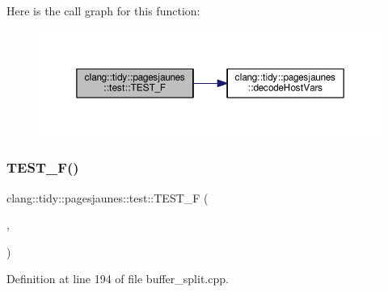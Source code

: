 Here is the call graph for this function\+:
\nopagebreak
\begin{figure}[H]
\begin{center}
\leavevmode
\includegraphics[width=350pt]{namespaceclang_1_1tidy_1_1pagesjaunes_1_1test_a72cdf106c1033f23fee1e696bccbc59a_cgraph}
\end{center}
\end{figure}
\mbox{\label{namespaceclang_1_1tidy_1_1pagesjaunes_1_1test_a165e5998fefd397abdb120da57c0ff98}} 
\subsubsection{\texorpdfstring{T\+E\+S\+T\+\_\+\+F()}{TEST\_F()}\hspace{0.1cm}{\footnotesize\ttfamily [44/57]}}
{\footnotesize\ttfamily clang\+::tidy\+::pagesjaunes\+::test\+::\+T\+E\+S\+T\+\_\+F (\begin{DoxyParamCaption}\item[{\hyperlink{classclang_1_1tidy_1_1pagesjaunes_1_1test_1_1_buffer_split_test}{Buffer\+Split\+Test}}]{,  }\item[{Big\+Buffers2}]{ }\end{DoxyParamCaption})}



Definition at line 194 of file buffer\+\_\+split.\+cpp.

